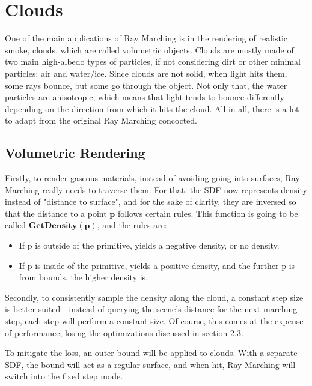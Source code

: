 \chapter{Clouds}\label{chp:LABEL_CHP_4}

One of the main applications of Ray Marching is in the rendering of realistic smoke, clouds, which are called volumetric objects. Clouds are mostly made of two main high-albedo types of particles, if not considering dirt or other minimal particles: air and water/ice. \cite{:REF_IN_1}
Since clouds are not solid, when light hits them, some rays bounce, but some go through the object. Not only that, the water particles are anisotropic\cite{:REF_IN_1}, which means that light tends to bounce differently depending on the direction from which it hits the cloud. All in all, there is a lot to adapt from the original Ray Marching concocted. 

\section{Volumetric Rendering}

Firstly, to render gaseous materials, instead of avoiding going into surfaces, Ray Marching really needs to traverse them. For that, the SDF now represents density instead of "distance to surface", and for the sake of clarity, they are inversed so that the distance to a point $\mathbf{p}$ follows certain rules. This function is going to be called $\mathbf{GetDensity(p)}$, and the rules are:

\begin{itemize}
    \item If p is outside of the primitive, yields a negative density, or no density.
    \item If p is inside of the primitive, yields a positive density, and the further p is from bounds, the higher density is.
\end{itemize}

Secondly, to consistently sample the density along the cloud, a constant step size is better suited - instead of querying the scene's distance for the next marching step, each step will perform a constant size. Of course, this comes at the expense of performance, losing the optimizations discussed in section 2.3.

To mitigate the loss, an outer bound will be applied to clouds. With a separate SDF, the bound will act as a regular surface, and when hit, Ray Marching will switch into the fixed step mode.


